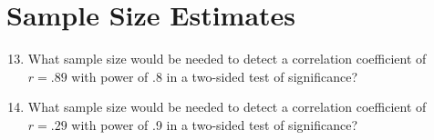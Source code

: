 \documentclass{tufte-handout}
\begin{document}
\vspace{5mm}
\section{Sample Size Estimates}
\begin{enumerate}
\setcounter{enumi}{12}
\item What sample size would be needed to detect a correlation coefficient of $r = .89$ with power of .8 in a two-sided test of significance?
\item What sample size would be needed to detect a correlation coefficient of $r = .29$ with power of .9 in a two-sided test of significance?
\end{enumerate}
\end{document}
